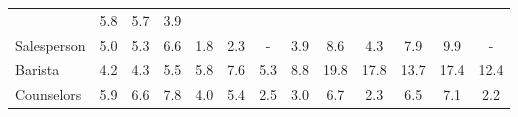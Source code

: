 \begin{table*}[p]
{\begin{tabular}{l|ccc|ccc|ccc|ccc}
& \cellcolor{orange2} 5.8 & \cellcolor{orange2} 5.7 & \cellcolor{blue2} 3.9
\\
Salesperson
& \cellcolor{orange2} 5.0 & \cellcolor{orange2} 5.3 & \cellcolor{orange3} 6.6
& \cellcolor{orange1} 1.8 & \cellcolor{orange1} 2.3 & \cellcolor{lightgray} -
& \cellcolor{orange2} 3.9 & \cellcolor{orange3} 8.6 & \cellcolor{orange2} 4.3
& \cellcolor{orange3} 7.9 & \cellcolor{orange4} 9.9 & \cellcolor{lightgray} -
\\
Barista
& \cellcolor{orange2} 4.2 & \cellcolor{orange2} 4.3 & \cellcolor{orange2} 5.5
& \cellcolor{orange2} 5.8 & \cellcolor{orange3} 7.6 & \cellcolor{orange2} 5.3
& \cellcolor{orange3} 8.8 & \cellcolor{orange7} 19.8 & \cellcolor{orange7} 17.8
& \cellcolor{orange5} 13.7 & \cellcolor{orange7} 17.4 & \cellcolor{orange5} 12.4
\\
Counselors
& \cellcolor{orange2} 5.9 & \cellcolor{orange3} 6.6 & \cellcolor{orange3} 7.8
& \cellcolor{orange2} 4.0 & \cellcolor{orange2} 5.4 & \cellcolor{orange1} 2.5
& \cellcolor{orange1} 3.0 & \cellcolor{orange3} 6.7 & \cellcolor{orange1} 2.3
& \cellcolor{orange2} 6.5 & \cellcolor{orange3} 7.1 & \cellcolor{blue1} 2.2
\\

\bottomrule
\end{tabular}
}
\label{appendix:stat-results-par2}
\end{table*}